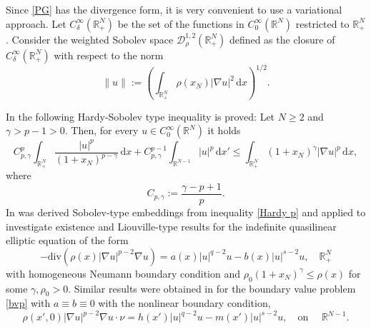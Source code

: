 \documentclass[12pt,reqno]{amsart}
\begin{document}
Since  \eqref{PG} has the divergence form, it is very convenient to use a variational approach. Let $C^\infty_\delta(\mathds{R}^N_+)$ be the set of the functions in $C^\infty_0(\mathds{R}^N)$ restricted to $\mathds{R}^N_+$. Consider the weighted Sobolev space $\mathcal{D}^{1,2}_\rho(\mathds{R}^N_+)$ defined as the closure of 
 $C_\delta^\infty(\mathds{R}^N_+)$ with respect to the norm
	$$
		\|u\|:=\left(\int_{\mathds{R}^{N}_+}\rho(x_N)|\nabla u|^2\, \mathrm{d} x\right)^{1/2}.
	$$

In \cite{Abreu-Furtado-Medeiros 2,Do-Freire-Medeiros} the following Hardy-Sobolev type inequality is proved: Let $N\geq 2$ and $\gamma>p-1>0$. Then, for every $u \in C^{\infty}_0(\mathds{R}^N)$ it holds 
\begin{equation}\label{Hardy p}
C_{p,\gamma}^p \int_{\mathds{R}_{+}^N}\frac{|u|^p}{(1+x_N)^{p-\gamma}}\, \mathrm{d}  x  + 
			C_{p,\gamma}^{p-1} \int_{\mathds{R}^{N-1}}|u|^p\, \mathrm{d}  x'
			\leq \int_{\mathds{R}_{+}^N}(1+x_N)^\gamma |\nabla u|^p \, \mathrm{d} x,
		\end{equation}
where
$$
			C_{p,\gamma}:=\frac{\gamma-p+1}{p}.
$$
In \cite{Do-Freire-Medeiros}  was derived Sobolev-type embeddings from inequality \eqref{Hardy p} and applied to investigate existence and Liouville-type results for the indefinite quasilinear elliptic equation of the form
\begin{equation}\label{bvp}
    -\mathrm{div}(\rho(x)|\nabla u|^{p-2}\nabla u)=a(x)|u|^{q-2}u-b(x)|u|^{s-2}u, \quad \mathds{R}^N_+
\end{equation}
 with homogeneous Neumann boundary condition and $\rho_0(1+x_N)^\gamma\leq \rho(x)$ for some $\gamma, \rho_0>0$.  
 Similar results were obtained in \cite{Do-Freire-Medeiros 2} for the boundary value problem \eqref{bvp} with $a\equiv b \equiv0$ with the nonlinear boundary condition,
 \begin{equation*}
     \rho(x',0)|\nabla u|^{p-2}\nabla u\cdot\nu=h(x')|u|^{q-2}u-m(x')|u|^{s-2}u, \quad \mbox{on } \quad \mathds{R}^{N-1}.
 \end{equation*}
\end{document}
